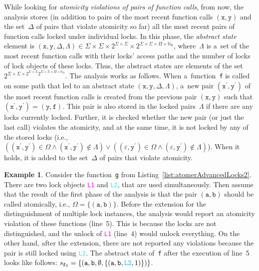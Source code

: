 \documentclass{ExcelAtFIT}
\theoremstyle{definition}
\newtheorem{example}{Example}[section]
\begin{document}
While looking for \emph{atomicity violations of pairs of function calls}, from now, the analysis stores (in addition to pairs of the most recent function calls $ (\mathtt{x, y}) $ and the set~$ \Delta $ of pairs that violate atomicity so far) all the most recent pairs of function calls locked under individual locks. In this phase, the \emph{abstract state} element is $ {(\mathtt{x, y}, \Delta, \Lambda)} \in \Sigma \times \Sigma \times 2^{\Sigma \times \Sigma} \times 2^{\Sigma \times \Sigma \times \Pi \times \mathbb{N}_0} $, where~$ \Lambda $ is a~set of the most recent function calls with their locks' access paths and the number of locks of lock objects of these locks. Thus, the abstract states are elements of the set $ 2^{\Sigma \times \Sigma \times 2^{\Sigma \times \Sigma} 2^{\Sigma \times \Sigma \times \Pi \times \mathbb{N}_0}} $. The analysis works as follows. When a~function~\texttt{f} is called on some path that led to an abstract state ${ (\mathtt{x, y}, \Delta, \Lambda) }$, a~new pair ${ (\mathtt{x}^\prime, \mathtt{y}^\prime) }$ of the most recent function calls is created from the previous pair ${ (\mathtt{x, y}) }$ such that $ {(\mathtt{x}^\prime, \mathtt{y}^\prime)} = {(\mathtt{y, f})} $. This pair is also stored in the locked pairs~$ \Lambda $ if there are any locks currently locked. Further, it is checked whether the new pair (or just the last call) violates the atomicity, and at the same time, it is not locked by any of the stored locks (i.e., $ ({(\mathtt{x}^\prime, \mathtt{y}^\prime)} \in \Omega \wedge {(\mathtt{x}^\prime, \mathtt{y}^\prime)} \notin \Lambda) \vee ({(\varepsilon, \mathtt{y}^\prime)} \in \Omega \wedge {(\varepsilon, \mathtt{y}^\prime)} \notin \Lambda) $). When it holds, it is added to the set~$ \Delta $ of pairs that violate atomicity.

\begin{example}
    Consider the function~\texttt{g} from Listing~\ref{list:atomerAdvancedLocks2}. There are two lock objects \textcolor{magenta}{\texttt{L1}} and \textcolor{cyan}{\texttt{L2}}, that are used simultaneously. Then assume that the result of the first phase of the analysis is that the pair ${ (\mathtt{a, b}) }$ should be called atomically, i.e., $ \Omega = {\{(\mathtt{a, b})\}} $. Before the extension for the distinguishment of multiple lock instances, the analysis would report an atomicity violation of these functions (line~5). This is because the locks are not distinguished, and the unlock of \textcolor{magenta}{\texttt{L1}} (line~4) would unlock everything. On the other hand, after the extension, there are not reported any violations because the pair is still locked using \textcolor{cyan}{\texttt{L2}}. The abstract state of~\texttt{f} after the execution of line~5 looks like follows: $ s_{\mathtt{f}_5} = \{{(\mathtt{a}, \mathtt{b}, \emptyset, \{(\mathtt{a}, \mathtt{b}, \textcolor{cyan}{\mathtt{L2}}, 1)\})}\} $.
\end{example}
\end{document}
